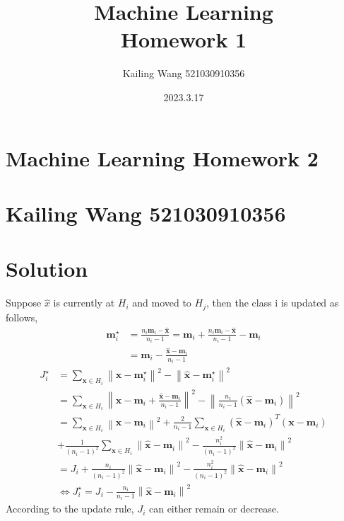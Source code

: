 \documentclass[a4paper]{article}
\title{\Huge Machine Learning \\ \LARGE Homework 1}
\author{Kailing Wang 521030910356}
\date{2023.3.17}
\begin{document}
	\section*{\Huge Machine Learning Homework 2}
	\section*{\normalsize Kailing Wang 521030910356}

	\section*{Solution}
	Suppose $\widehat{x}$ is currently at $H_i$ and moved to $H_j$, then the class i is updated as follows,
	$$
	\begin{aligned}
		\mathbf{m}_i^{\star} & =\frac{n_i \mathbf{m}_i-\hat{\mathbf{x}}}{n_i-1}=\mathbf{m}_i+\frac{n_i \mathbf{m}_i-\hat{\mathbf{x}}}{n_i-1}-\mathbf{m}_i \\
		& =\mathbf{m}_i-\frac{\hat{\mathbf{x}}-\mathbf{m}_i}{n_i-1}
	\end{aligned}
	$$
	$$
	\begin{aligned}
		J_i^{\star} & =\sum_{\mathbf{x} \in H_i}\left\|\mathbf{x}-\mathbf{m}_i^{\star}\right\|^2-\left\|\hat{\mathbf{x}}-\mathbf{m}_i^{\star}\right\|^2 \\
		& =\sum_{\mathbf{x} \in H_i}\left\|\mathbf{x}-\mathbf{m}_i+\frac{\hat{\mathbf{x}}-\mathbf{m}_i}{n_i-1}\right\|^2-\left\|\frac{n_i}{n_i-1}\left(\hat{\mathbf{x}}-\mathbf{m}_i\right)\right\|^2 \\
		& =\sum_{\mathbf{x} \in H_i}\left\|\mathbf{x}-\mathbf{m}_i\right\|^2+\frac{2}{n_i-1} \sum_{\mathbf{x} \in H_i}\left(\hat{\mathbf{x}}-\mathbf{m}_i\right)^T\left(\mathbf{x}-\mathbf{m}_i\right) \\
		& +\frac{1}{\left(n_i-1\right)^2} \sum_{\mathbf{x} \in H_i}\left\|\hat{\mathbf{x}}-\mathbf{m}_i\right\|^2-\frac{n_i^2}{\left(n_i-1\right)^2}\left\|\hat{\mathbf{x}}-\mathbf{m}_i\right\|^2 \\
		& =J_i+\frac{n_i}{\left(n_i-1\right)^2}\left\|\hat{\mathbf{x}}-\mathbf{m}_i\right\|^2-\frac{n_i^2}{\left(n_i-1\right)^2}\left\|\hat{\mathbf{x}}-\mathbf{m}_i\right\|^2 \\
		& \Leftrightarrow J_i^{\star}=J_i-\frac{n_i}{n_i-1}\left\|\hat{\mathbf{x}}-\mathbf{m}_i\right\|^2
	\end{aligned}
	$$
	According to the update rule, $J_i$ can either remain or decrease.
\end{document}
